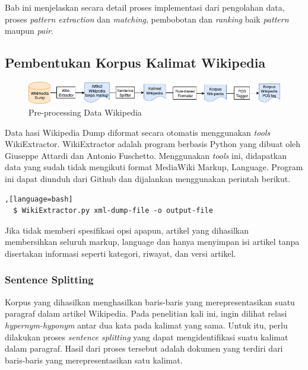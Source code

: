 \chapter{\babEmpat}
Bab ini menjelaskan secara detail proses implementasi dari pengolahan data, proses \textit{pattern extraction} dan \textit{matching}, pembobotan dan \textit{ranking} baik \textit{pattern} maupun \textit{pair}.

\section{Pembentukan Korpus Kalimat Wikipedia}
\begin{figure}
    \centering
    \includegraphics[width=\linewidth]{pics/Pic02-PreProcessingWikipedia}
    \caption{Pre-processing Data Wikipedia}
    \label{fig:preproses-wiki}
\end{figure}
Data hasi Wikipedia Dump diformat secara otomatis menggunakan \textit{tools} WikiExtractor. WikiExtractor adalah program berbasis Python yang dibuat oleh Giuseppe Attardi dan Antonio Fuschetto. Menggunakan \textit{tools} ini, didapatkan data yang sudah tidak mengikuti format MediaWiki Markup, Language. Program ini dapat diunduh dari Github dan dijalankan menggunakan perintah berikut. 
\begin{lstlisting},[language=bash]
  $ WikiExtractor.py xml-dump-file -o output-file
\end{lstlisting}
Jika tidak memberi spesifikasi opsi apapun, artikel yang dihasilkan membersihkan seluruh markup, language dan hanya menyimpan isi artikel tanpa disertakan informasi seperti kategori, riwayat, dan versi artikel.

\subsection{Sentence Splitting}
Korpus yang dihasilkan menghasilkan baris-baris yang merepresentasikan suatu paragraf dalam artikel Wikipedia. Pada penelitian kali ini, ingin dilihat relasi \textit{hypernym-hyponym} antar dua kata pada kalimat yang sama. Untuk itu, perlu dilakukan proses \textit{sentence splitting} yang dapat mengidentifikasi suatu kalimat dalam paragraf. Hasil dari proses tersebut adalah dokumen yang terdiri dari baris-baris yang merepresentasikan satu kalimat. 

